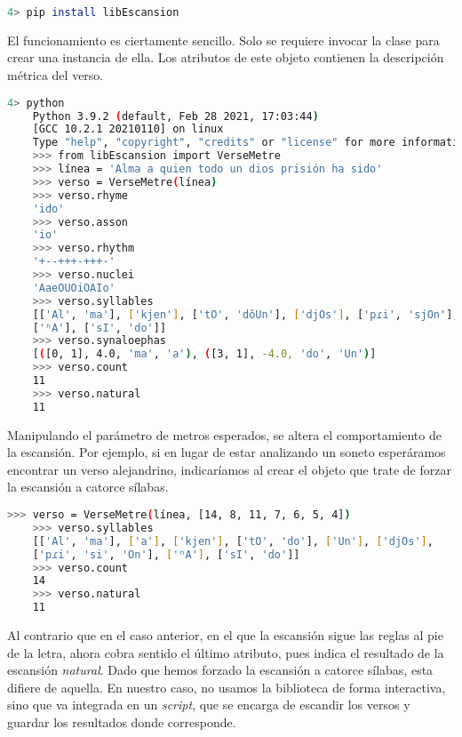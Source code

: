 \begin{lstlisting}[numbers=none, frame=none, keywordstyle=\ttfamily,  language=bash]
	4> pip install libEscansion
\end{lstlisting} %
El funcionamiento es ciertamente sencillo. Solo se requiere invocar la clase para crear una instancia de ella. Los atributos de este objeto contienen la descripción métrica del verso.
\begin{lstlisting}[numbers=none, frame=none, keywordstyle=\ttfamily,  language=bash]
	4> python
	Python 3.9.2 (default, Feb 28 2021, 17:03:44) 
	[GCC 10.2.1 20210110] on linux
	Type "help", "copyright", "credits" or "license" for more information.
	>>> from libEscansion import VerseMetre
	>>> línea = 'Alma a quien todo un dios prisión ha sido'
	>>> verso = VerseMetre(línea)
	>>> verso.rhyme
	'ido'
	>>> verso.asson
	'io'
	>>> verso.rhythm
	'+--+++-+++-'
	>>> verso.nuclei
	'AaeOUOiOAIo'
	>>> verso.syllables
	[['Al', 'ma'], ['kjen'], ['tO', 'dŏUn'], ['djOs'], ['pɾi', 'sjOn'],
	['ʰA'], ['sI', 'do']]
	>>> verso.synaloephas
	[([0, 1], 4.0, 'ma', 'a'), ([3, 1], -4.0, 'do', 'Un')]
	>>> verso.count
	11
	>>> verso.natural
	11
\end{lstlisting}

Manipulando el parámetro de metros esperados, se altera el comportamiento de la escansión. Por ejemplo, si en lugar de estar analizando un soneto esperáramos encontrar un verso alejandrino, indicaríamos al crear el objeto que trate de forzar la escansión a catorce sílabas.

\begin{lstlisting}[numbers=none, frame=none, keywordstyle=\ttfamily,  language=bash]
	>>> verso = VerseMetre(línea, [14, 8, 11, 7, 6, 5, 4])
	>>> verso.syllables
	[['Al', 'ma'], ['a'], ['kjen'], ['tO', 'do'], ['Un'], ['djOs'],
	['pɾi', 'si', 'On'], ['ʰA'], ['sI', 'do']]
	>>> verso.count
	14
	>>> verso.natural
	11
\end{lstlisting}

Al contrario que en el caso anterior, en el que la escansión sigue las reglas al pie de la letra, ahora cobra sentido el último atributo, pues indica el resultado de la escansión \textit{natural}. Dado que hemos forzado la escansión a catorce sílabas, esta difiere de aquella. En nuestro caso, no usamos la biblioteca de forma interactiva, sino que va integrada en un \textit{script}, que se encarga de escandir los versos y guardar los resultados donde corresponde.
